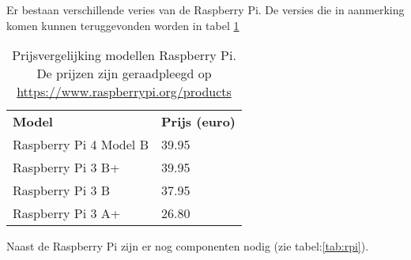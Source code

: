 \section{}
Er bestaan verschillende veries van de Raspberry Pi. De versies die in aanmerking komen kunnen teruggevonden worden in tabel \ref{tab:rpimodellen}
\begin{table}[]
	\begin{tabular}{ll}
		\textbf{Model}                  & \textbf{Prijs (euro)} \\
		Raspberry Pi 4 Model B & 39.95        \\
		Raspberry Pi 3 B+      & 39.95        \\
		Raspberry Pi 3 B       & 37.95        \\
		Raspberry Pi 3 A+      & 26.80       
	\end{tabular}
\caption[Prijsvergelijking Raspberry Pi]{Prijsvergelijking modellen Raspberry Pi. De prijzen zijn geraadpleegd op \url{https://www.raspberrypi.org/products}}
\label{tab:rpimodellen}
\end{table}
\newline
Naast de Raspberry Pi zijn er nog componenten nodig (zie tabel:\ref{tab:rpi}).
